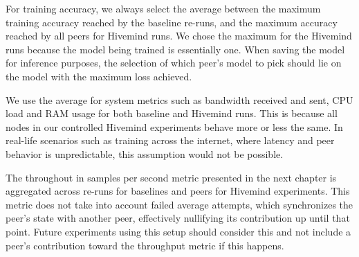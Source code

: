 For training accuracy, we always select the average between the maximum training accuracy reached by the baseline re-runs, and the maximum accuracy reached by all peers for Hivemind runs.
We chose the maximum for the Hivemind runs because the model being trained is essentially one.
When saving the model for inference purposes, the selection of which peer's model to pick should lie on the model with the maximum loss achieved.

We use the average for system metrics such as bandwidth received and sent, CPU load and RAM usage for both baseline and Hivemind runs.
This is because all nodes in our controlled Hivemind experiments behave more or less the same.
In real-life scenarios such as training across the internet, where latency and peer behavior is unpredictable, this assumption would not be possible.

The throughout in samples per second metric presented in the next chapter is aggregated across re-runs for baselines and peers for Hivemind experiments.
This metric does not take into account failed average attempts, which synchronizes the peer's state with another peer, effectively nullifying its contribution up until that point.
Future experiments using this setup should consider this and not include a peer's contribution toward the throughput metric if this happens.

